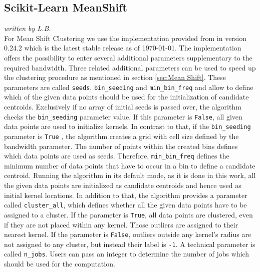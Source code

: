 \subsection{Scikit-Learn MeanShift}
\label{subsec:sklearn_meanshift}
\textit{written by L.B.}\\

For Mean Shift Clustering we use the implementation provided from \cite{sklearn_api} in version 0.24.2 which is the latest stable release as of \today. 
The implementation offers the possibility to enter several additional parameters supplementary to the required bandwidth. Three related additional parameters can be used to speed up the clustering procedure as mentioned in section \ref{sec:Mean Shift}. These parameters are called \texttt{seeds}, \texttt{bin_seeding} and \texttt{min_bin_freq} and allow to define which of the given data points should be used for the initialization of candidate centroids. Exclusively if no array of initial seeds is passed over, the algorithm checks the \texttt{bin_seeding} parameter value. If this parameter is \texttt{False}, all given data points are used to initialize kernels. In contrast to that, if the \texttt{bin_seeding} parameter is \texttt{True} , the algorithm creates a grid with cell size defined by the bandwidth parameter. The number of points within the created bins defines which data points are used as seeds. Therefore, \texttt{min_bin_freq} defines the minimum number of data points that have to occur in a bin to define a candidate centroid.
Running the algorithm in its default mode, as it is done in this work, all the given data points are initialized as candidate centroids and hence used as initial kernel locations. 
In addition to that, the algorithm provides a parameter called \texttt{cluster_all}, which defines whether all the given data points have to be assigned to a cluster. If the parameter is \texttt{True}, all data points are clustered, even if they are not placed within any kernel. Those outliers are assigned to their nearest kernel. If the parameter is \texttt{False}, outliers outside any kernel's radius are not assigned to any cluster, but instead their label is \texttt{-1}. 
A technical parameter is called \texttt{n_jobs}. Users can pass an integer to determine the number of jobs which should be used for the computation.\\
